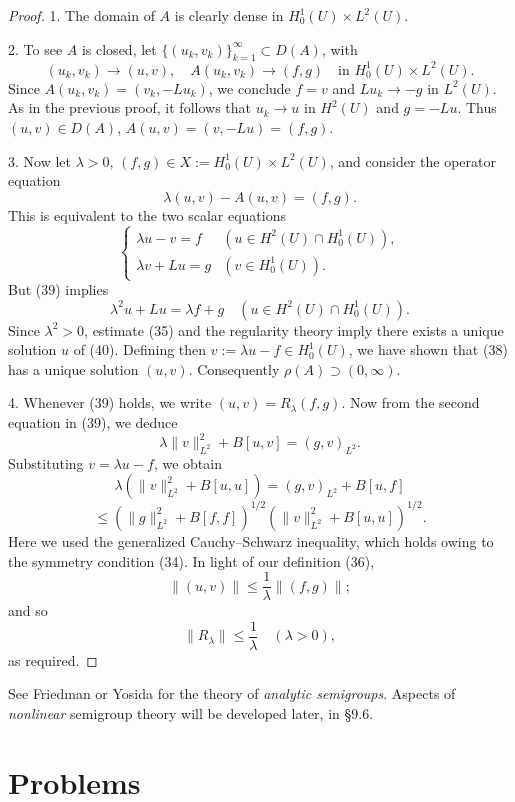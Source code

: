 \begin{proof}
1. The domain of $A$ is clearly dense in $H_0^1(U) \times L^2(U)$.

2. To see $A$ is closed, let $\{(u_k, v_k)\}_{k=1}^\infty \subset D(A)$, with
\[
(u_k, v_k) \to (u,v), \quad A(u_k, v_k) \to (f,g) \quad \text{in } H_0^1(U) \times L^2(U).
\]
Since $A(u_k, v_k) = (v_k, -Lu_k)$, we conclude $f = v$ and $Lu_k \to -g$ in $L^2(U)$. As in the previous proof, it follows that $u_k \to u$ in $H^2(U)$ and $g = -Lu$. Thus $(u,v) \in D(A)$, $A(u,v) = (v,-Lu) = (f,g)$.

3. Now let $\lambda > 0$, $(f,g) \in X := H_0^1(U) \times L^2(U)$, and consider the operator equation
\[
\lambda(u,v) - A(u,v) = (f,g).
\tag{38}
\]
This is equivalent to the two scalar equations
\[
\begin{cases} \lambda u - v = f & (u \in H^2(U) \cap H_0^1(U)), \\ \lambda v + Lu = g & (v \in H_0^1(U)). \end{cases}
\tag{39}
\]
But (39) implies
\[
\lambda^2 u + Lu = \lambda f + g \quad (u \in H^2(U) \cap H_0^1(U)).
\tag{40}
\]
Since $\lambda^2 > 0$, estimate (35) and the regularity theory imply there exists a unique solution $u$ of (40). Defining then $v := \lambda u - f \in H_0^1(U)$, we have shown that (38) has a unique solution $(u,v)$. Consequently $\rho(A) \supset (0,\infty)$.

4. Whenever (39) holds, we write $(u,v) = R_\lambda(f,g)$. Now from the second equation in (39), we deduce
\[
\lambda \|v\|_{L^2}^2 + B[u,v] = (g,v)_{L^2}.
\]
Substituting $v = \lambda u - f$, we obtain
\[
\lambda \left( \|v\|_{L^2}^2 + B[u,u] \right) = (g,v)_{L^2} + B[u,f]
\]
\[
\leq \left( \|g\|_{L^2}^2 + B[f,f] \right)^{1/2} \left( \|v\|_{L^2}^2 + B[u,u] \right)^{1/2}.
\]
Here we used the generalized Cauchy--Schwarz inequality, which holds owing to the symmetry condition (34). In light of our definition (36),
\[
\|(u,v)\| \leq \frac{1}{\lambda} \|(f,g)\|;
\]
and so
\[
\|R_\lambda\| \leq \frac{1}{\lambda} \quad (\lambda > 0),
\]
as required.
\end{proof}

See Friedman \cite{Friedman1969} or Yosida \cite{Yosida1980} for the theory of \textit{analytic semigroups}. Aspects of \textit{nonlinear} semigroup theory will be developed later, in \S9.6.

\section{Problems}
\label{sec:linear-evolution-equations-problems}

